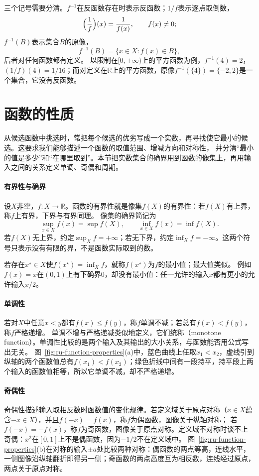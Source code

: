 三个记号需要分清。$f^{-1}$在反函数存在时表示反函数；$1/f$表示逐点取倒数，
\[
 \Bigl(\frac1f\Bigr)(x)=\frac1{f(x)},\qquad f(x)\neq0;
\]
$f^{-1}(B)$表示集合$B$的原像，
\[
 f^{-1}(B)=\{x\in X:f(x)\in B\},
\]
后者对任何函数都有定义。
以限制在$[0,+\infty)$上的平方函数为例，$f^{-1}(4)=2$，$(1/f)(4)=1/16$；而对定义在$\mathbb R$上的平方函数，原像$f^{-1}(\{4\})=\{-2,2\}$是一个集合，它没有反函数。

\section{函数的性质}
\label{sec:prelim-optimal-values-errors}
\label{sec:ru-function-properties}

从候选函数中挑选时，常把每个候选的优劣写成一个实数，再寻找使它最小的候选。这要求我们能够描述一个函数的取值范围、增减方向和对称性，
并分清“最小的值是多少”和“在哪里取到”。本节把实数集合的确界用到函数的像集上，再用输入之间的关系定义单调、奇偶和周期。

\paragraph{有界性与确界}
设$X$非空，$f:X\to\mathbb R$。函数的有界性就是像集$f(X)$的有界性：若$f(X)$有上界，称$f$上有界，下界与有界同理。
像集的确界简记为
\[
 \sup_{x\in X}f(x)=\sup f(X),\qquad \inf_{x\in X}f(x)=\inf f(X).
\]
若$f(X)$无上界，约定$\sup_Xf=+\infty$；若无下界，约定$\inf_Xf=-\infty$。这两个符号只表示没有有限的界，不是函数实际取到的数。

若存在$x^\star\in X$使$f(x^\star)=\inf_Xf$，就称$f(x^\star)$为$f$的最小值；最大值类似。
例如$f(x)=x$在$(0,1)$上有下确界$0$，却没有最小值：任一允许的输入$x$都有更小的允许输入$x/2$。

\paragraph{单调性}
若对$X$中任意$x<y$都有$f(x)\leq f(y)$，称$f$单调不减；若总有$f(x)<f(y)$，称$f$严格递增。
单调不增与严格递减类似地定义，它们统称（monotone function）。单调性比较的是两个输入及其输出的大小关系，与函数能否用公式写出无关。
图~\ref{fig:ru-function-properties}(a)中，蓝色曲线上任取$x_1<x_2$，虚线引到纵轴的两个函数值总有$f(x_1)<f(x_2)$；绿色折线中间有一段持平，持平段上两个输入的函数值相等，所以它单调不减，却不严格递增。

\paragraph{奇偶性}
奇偶性描述输入取相反数时函数值的变化规律。若定义域关于原点对称（$x\in X$蕴含$-x\in X$），并且$f(-x)=f(x)$，称$f$为偶函数，图像关于纵轴对称；
若$f(-x)=-f(x)$，称$f$为奇函数，图像关于原点对称。定义域不对称时谈不上奇偶：$x^2$在$[0,1]$上不是偶函数，因为$-1/2$不在定义域中。
图~\ref{fig:ru-function-properties}(b)在对称的输入$\pm a$处比较两种对称：偶函数的两点等高，连线水平，一侧图像沿纵轴翻折即得另一侧；奇函数的两点高度互为相反数，连线经过原点，两点关于原点对称。

